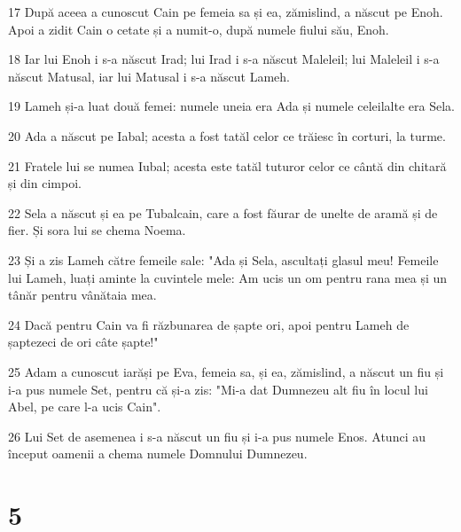\par 17 După aceea a cunoscut Cain pe femeia sa și ea, zămislind, a născut pe Enoh. Apoi a zidit Cain o cetate și a numit-o, după numele fiului său, Enoh.
\par 18 Iar lui Enoh i s-a născut Irad; lui Irad i s-a născut Maleleil; lui Maleleil i s-a născut Matusal, iar lui Matusal i s-a născut Lameh.
\par 19 Lameh și-a luat două femei: numele uneia era Ada și numele celeilalte era Sela.
\par 20 Ada a născut pe Iabal; acesta a fost tatăl celor ce trăiesc în corturi, la turme.
\par 21 Fratele lui se numea Iubal; acesta este tatăl tuturor celor ce cântă din chitară și din cimpoi.
\par 22 Sela a născut și ea pe Tubalcain, care a fost făurar de unelte de aramă și de fier. Și sora lui se chema Noema.
\par 23 Și a zis Lameh către femeile sale: "Ada și Sela, ascultați glasul meu! Femeile lui Lameh, luați aminte la cuvintele mele: Am ucis un om pentru rana mea și un tânăr pentru vânătaia mea.
\par 24 Dacă pentru Cain va fi răzbunarea de șapte ori, apoi pentru Lameh de șaptezeci de ori câte șapte!"
\par 25 Adam a cunoscut iarăși pe Eva, femeia sa, și ea, zămislind, a născut un fiu și i-a pus numele Set, pentru că și-a zis: "Mi-a dat Dumnezeu alt fiu în locul lui Abel, pe care l-a ucis Cain".
\par 26 Lui Set de asemenea i s-a născut un fiu și i-a pus numele Enos. Atunci au început oamenii a chema numele Domnului Dumnezeu.

\chapter{5}

